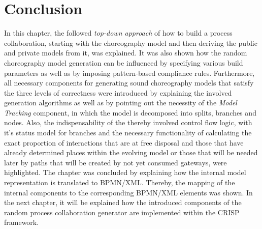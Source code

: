 \section{Conclusion}
In this chapter, the followed \textit{top-down approach} of how to build a process collaboration, starting with the choreography model and then deriving the public and private models from it, was explained. It was also shown how the random choreography model generation can be influenced by specifying various build parameters as well as by imposing pattern-based compliance rules. Furthermore, all necessary components for generating sound choreography models that satisfy the three levels of correctness were introduced by explaining the involved generation algorithms as well as by pointing out the necessity of the \textit{Model Tracking} component, in which the model is decomposed into splits, branches and nodes. Also, the indispensability of the thereby involved control flow logic, with it's status model for branches and the necessary functionality of calculating the exact proportion of interactions that are at free disposal and those that have already determined places within the evolving model or those that will be needed later by paths that will be created by not yet consumed gateways, were highlighted. The chapter was concluded by explaining how the internal model representation is translated to BPMN/XML. Thereby, the mapping of the internal components to the corresponding BPMN/XML elements was shown.
In the next chapter, it will be explained how the introduced components of the random process collaboration generator are implemented within the CRISP framework.